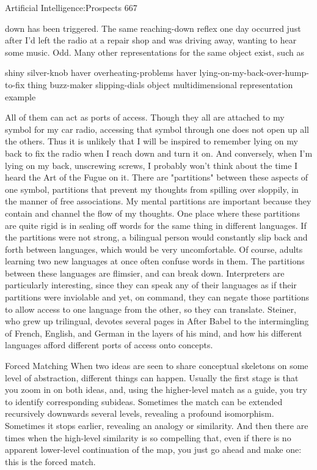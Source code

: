Artificial Intelligence:Prospects                                                         667

down has been triggered. The same reaching-down reflex one day occurred just after I'd
left the radio at a repair shop and was driving away, wanting to hear some music. Odd.
Many other representations for the same object exist, such as

               shiny silver-knob haver
               overheating-problems haver
               lying-on-my-back-over-hump-to-fix thing
               buzz-maker
               slipping-dials object
               multidimensional representation example

All of them can act as ports of access. Though they all are attached to my symbol for my
car radio, accessing that symbol through one does not open up all the others. Thus it is
unlikely that I will be inspired to remember lying on my back to fix the radio when I
reach down and turn it on. And conversely, when I'm lying on my back, unscrewing
screws, I probably won't think about the time I heard the Art of the Fugue on it. There are
"partitions" between these aspects of one symbol, partitions that prevent my thoughts
from spilling over sloppily, in the manner of free associations. My mental partitions are
important because they contain and channel the flow of my thoughts.
        One place where these partitions are quite rigid is in sealing off words for the
same thing in different languages. If the partitions were not strong, a bilingual person
would constantly slip back and forth between languages, which would be very
uncomfortable. Of course, adults learning two new languages at once often confuse
words in them. The partitions between these languages are flimsier, and can break down.
Interpreters are particularly interesting, since they can speak any of their languages as if
their partitions were inviolable and yet, on command, they can negate those partitions to
allow access to one language from the other, so they can translate. Steiner, who grew up
trilingual, devotes several pages in After Babel to the intermingling of French, English,
and German in the layers of his mind, and how his different languages afford different
ports of access onto concepts.

                                    Forced Matching
When two ideas are seen to share conceptual skeletons on some level of abstraction,
different things can happen. Usually the first stage is that you zoom in on both ideas, and,
using the higher-level match as a guide, you try to identify corresponding subideas.
Sometimes the match can be extended recursively downwards several levels, revealing a
profound isomorphism. Sometimes it stops earlier, revealing an analogy or similarity.
And then there are times when the high-level similarity is so compelling that, even if
there is no apparent lower-level continuation of the map, you just go ahead and make
one: this is the forced match.




